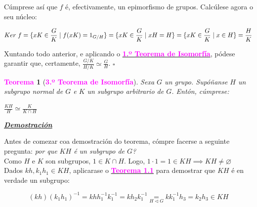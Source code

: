 \documentclass[twoside]{report}
\newcommand{\magbf}[1]{\textcolor{magenta}{\textbf{#1}}} %
\theoremstyle{mystyle}
\newtheorem{theo}{\magbf{Teorema}}[chapter]
\newenvironment{theorem}
{\begin{mdframed}[linecolor = magenta,backgroundcolor = classicrose, linewidth = 2mm]\begin{theo}}
{\end{theo}\end{mdframed}}
\begin{document}
\noindent Cúmprese así que $f$ é, efectivamente, un epimorfismo de grupos. Calcúlese agora o seu núcleo: 

$$Ker \hspace{1mm} f = \{xK \in \displaystyle \frac{G}{K} \hspace{1mm} | \hspace{1mm} f(xK) = 1_{G/H}\} = \{xK \in \displaystyle \frac{G}{K} \hspace{1mm} | \hspace{1mm} xH = H \} = \{xK \in \displaystyle \frac{G}{K} \hspace{1mm} | \hspace{1mm} x \in H\} = \displaystyle \frac{H}{K}$$

\noindent Xuntando todo anterior, e aplicando o \hyperref[th1.5]{\magbf{1.º Teorema de Isomorfía}}, pódese garantir que, certamente, $\displaystyle \frac{G/K}{H/K} \simeq \displaystyle \frac{G}{H}$. $\square$

\vspace{2mm}

\begin{theorem}[\magbf{3.º Teorema de Isomorfía}] \label{th1.7}
Sexa $G$ un grupo. Supóñanse $H$ un subgrupo normal de $G$ e $K$ un subgrupo arbitrario de $G$. Entón, cúmprese:
\begin{center}
    $\displaystyle \frac{KH}{H} \simeq \displaystyle \frac{K}{K \cap H}$
\end{center}
\end{theorem}

\vspace{2mm}

\noindent \textbf{\textit{\underline{Demostración}}}

\vspace{2mm}

\begin{mdframed}[linecolor = magenta]

\noindent Antes de comezar coa demostración do teorema, cómpre facerse a seguinte pregunta: \textit{por que $KH$ é un subgrupo de $G$?}\\

\noindent Como $H$ e $K$ son subgrupos, $1 \in K \cap H $. Logo, $1 \cdot 1 = 1 \in KH \implies KH \neq \varnothing$\\

\noindent Dados $kh, k_{1}h_{1} \in KH$, aplicarase o \hyperref[th1.1]{\magbf{Teorema 1.1}} para demostrar que $KH$ é en verdade un subgrupo:

$$(kh)(k_{1}h_{1})^{-1} = khh_{1}^{-1}k_{1}^{-1} = kh_{2}k_{1}^{-1} \underset{H \triangleleft G}{=} kk_{1}^{-1}h_{3} = k_{2}h_{3} \in KH$$

\end{mdframed}
\end{document}
